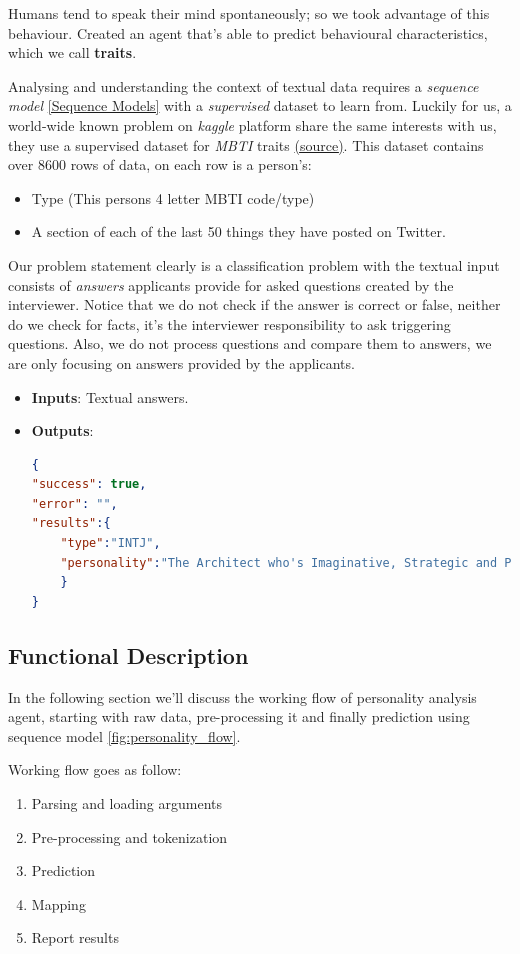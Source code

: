 Humans tend to speak their mind spontaneously; so we took advantage of this behaviour. Created an agent that's able to predict behavioural characteristics, which we call \textbf{traits}.

Analysing and understanding the context of textual data requires a \textit{sequence model} \ref{Sequence Models} with a \textit{supervised} dataset to learn from. Luckily for us, a world-wide known problem on \textit{kaggle} platform share the same interests with us, they use a supervised dataset for \textit{MBTI} traits \href{https://www.kaggle.com/datasnaek/mbti-type}{(\underline{source})}. This dataset contains over 8600 rows of data, on each row is a person’s:
\begin{itemize}
    \item Type (This persons 4 letter MBTI code/type)
    \item A section of each of the last 50 things they have posted on Twitter.
\end{itemize}

Our problem statement clearly is a classification problem with the textual input consists of \textit{answers} applicants provide for asked questions created by the interviewer. Notice that we do not check if the answer is correct or false, neither do we check for facts, it's the interviewer responsibility to ask triggering questions. Also, we do not process questions and compare them to answers, we are only focusing on answers provided by the applicants.


\begin{itemize}
    \item \textbf{Inputs}: Textual answers.
    \item \textbf{Outputs}: 
    \begin{lstlisting}[language=json,firstnumber=1]
{
"success": true,
"error": "",
"results":{
    "type":"INTJ",
    "personality":"The Architect who's Imaginative, Strategic and Planner"
    }
}
    \end{lstlisting}
\end{itemize}
\subsection{Functional Description}
In the following section we'll discuss the working flow of personality analysis agent, starting with raw data, pre-processing it and finally prediction using sequence model \ref{fig:personality_flow}.

Working flow goes as follow:
\begin{enumerate}
    \item Parsing and loading arguments
    \item Pre-processing and tokenization
    \item Prediction
    \item Mapping
    \item Report results
\end{enumerate}


